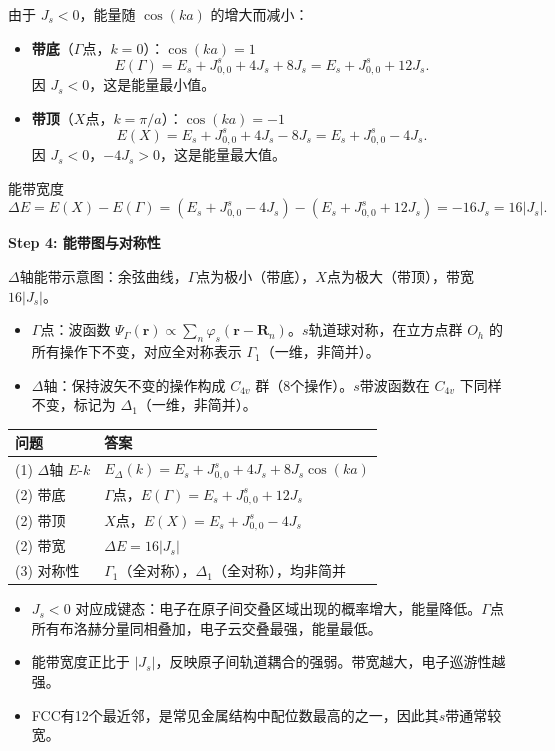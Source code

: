 \begin{derivationbox}[标准解题过程]
由于 $J_s<0$，能量随 $\cos(ka)$ 的增大而减小：
\begin{itemize}
    \item \textbf{带底}（$\Gamma$点，$k=0$）：$\cos(ka)=1$
    \begin{equation}
    E(\Gamma) = E_s + J_{0,0}^{s} + 4J_s + 8J_s = E_s + J_{0,0}^{s} + 12J_s.
    \end{equation}
    因 $J_s<0$，这是能量最小值。
    \item \textbf{带顶}（$X$点，$k=\pi/a$）：$\cos(ka)=-1$
    \begin{equation}
    E(X) = E_s + J_{0,0}^{s} + 4J_s - 8J_s = E_s + J_{0,0}^{s} - 4J_s.
    \end{equation}
    因 $J_s<0$，$-4J_s>0$，这是能量最大值。
\end{itemize}

能带宽度
\begin{equation}
\boxed{\Delta E = E(X) - E(\Gamma) = (E_s+J_{0,0}^{s}-4J_s) - (E_s+J_{0,0}^{s}+12J_s) = -16J_s = 16|J_s|.}
\end{equation}

\textbf{Step 4: 能带图与对称性}

$\Delta$轴能带示意图：余弦曲线，$\Gamma$点为极小（带底），$X$点为极大（带顶），带宽 $16|J_s|$。

\begin{itemize}
    \item $\Gamma$点：波函数 $\Psi_{\Gamma}(\bm{r})\propto\sum_n\varphi_s(\bm{r}-\bm{R}_n)$。$s$轨道球对称，在立方点群 $O_h$ 的所有操作下不变，对应全对称表示 $\Gamma_1$（一维，非简并）。
    \item $\Delta$轴：保持波矢不变的操作构成 $C_{4v}$ 群（8个操作）。$s$带波函数在 $C_{4v}$ 下同样不变，标记为 $\Delta_1$（一维，非简并）。
\end{itemize}
\end{derivationbox}

\begin{formulabox}[答案汇总]
\begin{center}
\begin{tabular}{ll}
\toprule
\textbf{问题} & \textbf{答案} \\
\midrule
(1) $\Delta$轴 $E$-$k$ & $E_{\Delta}(k) = E_s+J_{0,0}^{s}+4J_s+8J_s\cos(ka)$ \\
(2) 带底 & $\Gamma$点，$E(\Gamma)=E_s+J_{0,0}^{s}+12J_s$ \\
(2) 带顶 & $X$点，$E(X)=E_s+J_{0,0}^{s}-4J_s$ \\
(2) 带宽 & $\Delta E=16|J_s|$ \\
(3) 对称性 & $\Gamma_1$（全对称），$\Delta_1$（全对称），均非简并 \\
\bottomrule
\end{tabular}
\end{center}
\end{formulabox}

\begin{insightbox}[物理图像]
\begin{itemize}
    \item $J_s<0$ 对应成键态：电子在原子间交叠区域出现的概率增大，能量降低。$\Gamma$点所有布洛赫分量同相叠加，电子云交叠最强，能量最低。
    \item 能带宽度正比于 $|J_s|$，反映原子间轨道耦合的强弱。带宽越大，电子巡游性越强。
    \item FCC有12个最近邻，是常见金属结构中配位数最高的之一，因此其$s$带通常较宽。
\end{itemize}
\end{insightbox}
